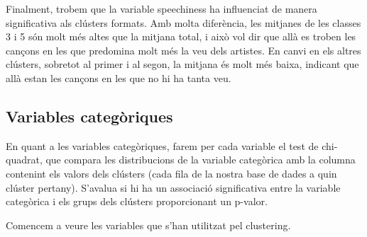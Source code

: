 \documentclass{article}
\begin{document}
Finalment, trobem que la variable speechiness ha influenciat de manera significativa als clústers formats. Amb molta diferència, les mitjanes de les classes 3 i 5 són molt més altes que la mitjana total, i això vol dir que allà es troben les cançons en les que predomina molt més la veu dels artistes. En canvi en els altres clústers, sobretot al primer i al segon, la mitjana és molt més baixa, indicant que allà estan les cançons en les que no hi ha tanta veu. 



\subsection{Variables categòriques}

En quant a les variables categòriques, farem per cada variable el test de chi-quadrat, que compara les distribucions de la variable categòrica amb la columna contenint els valors dels clústers (cada fila de la nostra base de dades a quin clúster pertany). S'avalua si hi ha un associació significativa entre la variable categòrica i els grups dels clústers proporcionant un p-valor.

Comencem a veure les variables que s'han utilitzat pel clustering.
\end{document}
